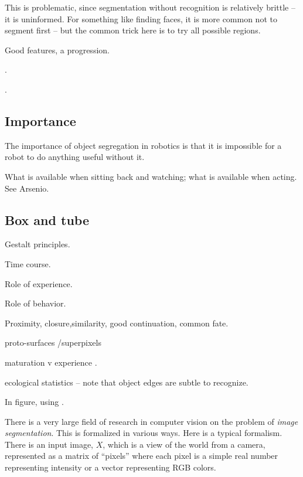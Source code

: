 This is problematic, since segmentation without
recognition is relatively brittle -- it is uninformed.
For something like finding faces, it is more common
not to segment first -- but the common trick here
is to try all possible regions.

Good features, a progression.

\cite{swain91color}.

\cite{schiele00recognition}.

\cite{lowe04distinctive}

\cite{felzenszwalb04efficient}

\subsection{Importance}

The importance of object segregation in robotics is 
that it is impossible for a robot to do anything 
useful without it.  

What is available when sitting back and watching; 
what is available when acting.  See Arsenio.



\subsection{Box and tube}



Gestalt principles.

Time course.

Role of experience.

Role of behavior.

Proximity, closure,similarity, good continuation, common fate.

proto-surfaces /superpixels

maturation v experience \cite{quinn05learning}.

ecological statistics \cite{martin04learning} -- note
that object edges are subtle to recognize.

In figure, using \cite{felzenszwalb04efficient}.

There is a very large field of research in computer vision on the
problem of {\it image segmentation}.  This is formalized in various
ways.  Here is a typical formalism.  There is an input image, $X$,
which is a view of the world from a camera, represented
as a matrix of ``pixels'' where each pixel is a simple
real number representing intensity or a vector representing
RGB colors.

